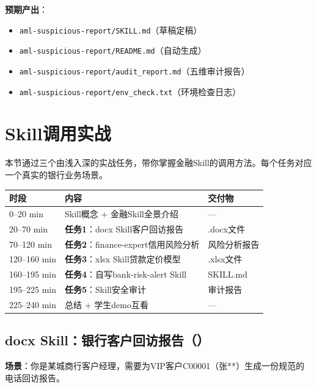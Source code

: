\textbf{预期产出}：
\begin{itemize}[leftmargin=1em]
  \item \texttt{aml-suspicious-report/SKILL.md}（草稿定稿）
  \item \texttt{aml-suspicious-report/README.md}（自动生成）
  \item \texttt{aml-suspicious-report/audit\_report.md}（五维审计报告）
  \item \texttt{aml-suspicious-report/env\_check.txt}（环境检查日志）
\end{itemize}

\section{Skill调用实战}

本节通过三个由浅入深的实战任务，带你掌握金融Skill的调用方法。每个任务对应一个真实的银行业务场景。

\begin{table}[H]
\centering
\begin{tabular}{lp{5.5cm}l}
\toprule
\textbf{时段} & \textbf{内容} & \textbf{交付物} \\
\midrule
0--20 min & Skill概念 + 金融Skill全景介绍 & --- \\
20--70 min & \textbf{任务1}：docx Skill客户回访报告 & .docx文件 \\
70--120 min & \textbf{任务2}：finance-expert信用风险分析 & 风险分析报告 \\
120--160 min & \textbf{任务3}：xlsx Skill贷款定价模型 & .xlsx文件 \\
160--195 min & \textbf{任务4}：自写bank-risk-alert Skill & SKILL.md \\
195--225 min & \textbf{任务5}：Skill安全审计 & 审计报告 \\
225--240 min & 总结 + 学生demo互看 & --- \\
\bottomrule
\end{tabular}
\end{table}

\subsection{docx Skill：银行客户回访报告（）}

\textbf{场景}：你是某城商行客户经理，需要为VIP客户C00001（张**）生成一份规范的电话回访报告。


